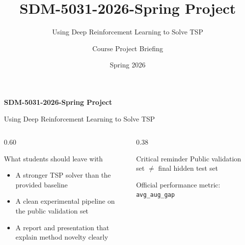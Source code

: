 \documentclass[aspectratio=169,11pt]{beamer}
\title{SDM-5031-2026-Spring Project}
\subtitle{Using Deep Reinforcement Learning to Solve TSP}
\author{Course Project Briefing}
\date{Spring 2026}
\begin{document}
\begin{frame}[plain]
  \vspace{0.5cm}
  {\color{sdmblue}\LARGE\textbf{SDM-5031-2026-Spring Project}\par}
  \vspace{0.2cm}
  {\Large Using Deep Reinforcement Learning to Solve TSP\par}
  \vspace{0.6cm}

  \begin{columns}[T,totalwidth=\textwidth]
    \begin{column}{0.60\textwidth}
      \begin{block}{What students should leave with}
        \begin{itemize}
          \item A stronger TSP solver than the provided baseline
          \item A clean experimental pipeline on the public validation set
          \item A report and presentation that explain method novelty clearly
        \end{itemize}
      \end{block}
    \end{column}
    \begin{column}{0.38\textwidth}
      \begin{alertblock}{Critical reminder}
        Public validation set $\neq$ final hidden test set

        Official performance metric: \texttt{avg\_aug\_gap}
      \end{alertblock}
    \end{column}
  \end{columns}

  \vfill
\end{frame}
\end{document}
